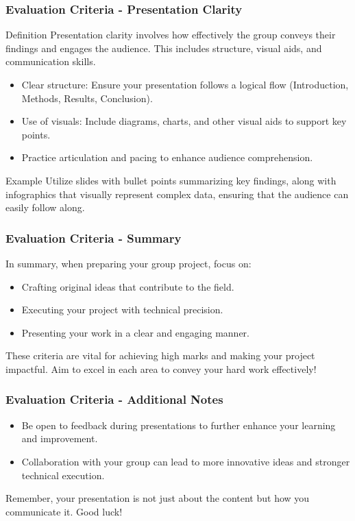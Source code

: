 \documentclass[aspectratio=169]{beamer}
\begin{document}
\begin{frame}[fragile]
    \frametitle{Evaluation Criteria - Presentation Clarity}
    \begin{block}{Definition}
        Presentation clarity involves how effectively the group conveys their findings and engages the audience. This includes structure, visual aids, and communication skills.
    \end{block}

    \begin{itemize}
        \item Clear structure: Ensure your presentation follows a logical flow (Introduction, Methods, Results, Conclusion).
        \item Use of visuals: Include diagrams, charts, and other visual aids to support key points.
        \item Practice articulation and pacing to enhance audience comprehension.
    \end{itemize}

    \begin{block}{Example}
        Utilize slides with bullet points summarizing key findings, along with infographics that visually represent complex data, ensuring that the audience can easily follow along.
    \end{block}
\end{frame}

\begin{frame}[fragile]
    \frametitle{Evaluation Criteria - Summary}
    In summary, when preparing your group project, focus on:
    \begin{itemize}
        \item Crafting original ideas that contribute to the field.
        \item Executing your project with technical precision.
        \item Presenting your work in a clear and engaging manner.
    \end{itemize}
    These criteria are vital for achieving high marks and making your project impactful. Aim to excel in each area to convey your hard work effectively!
\end{frame}

\begin{frame}[fragile]
    \frametitle{Evaluation Criteria - Additional Notes}
    \begin{itemize}
        \item Be open to feedback during presentations to further enhance your learning and improvement.
        \item Collaboration with your group can lead to more innovative ideas and stronger technical execution.
    \end{itemize}
    Remember, your presentation is not just about the content but how you communicate it. Good luck!
\end{frame}
\end{document}
